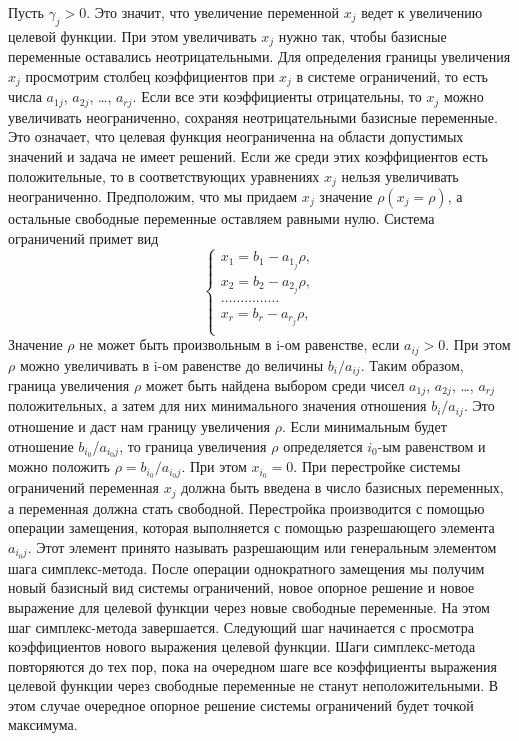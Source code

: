 Пусть $\gamma_j > 0$. Это значит, что увеличение переменной $x_j$ ведет к увеличению целевой функции. При этом увеличивать $x_j$ нужно так, чтобы базисные переменные оставались неотрицательными. Для определения границы увеличения $x_j$ просмотрим столбец коэффициентов при $x_j$ в системе ограничений, то есть числа
$a_{1j}$, $a_{2j}$, \dots, $a_{rj}$. Если все эти коэффициенты отрицательны, то $x_j$ можно увеличивать неограниченно, сохраняя неотрицательными базисные переменные. Это означает, что целевая функция неограниченна на области допустимых значений и задача не имеет решений. Если же среди этих коэффициентов есть положительные, то в соответствующих уравнениях $x_j$ нельзя увеличивать неограниченно. Предположим, что мы придаем $x_j$ значение $\rho  (x_j = \rho)$, а остальные свободные переменные оставляем равными нулю. Система ограничений примет вид
\begin{equation*}
\begin{cases}
x_1 = b_1 - a_{1_j}\rho,\\
x_2 = b_2 - a_{2_j}\rho,\\
\dots\dots\dots\dots\dots\\
x_r = b_r - a_{r_j}\rho,\\
\end{cases}
\end{equation*}
Значение $\rho$ не может быть произвольным в i-ом равенстве, если $a_{ij}>0$. При этом $\rho$ можно увеличивать в i-ом равенстве до величины $b_i/a_{ij}$. Таким образом, граница увеличения $\rho$ может быть найдена выбором среди чисел $a_{1j}$, $a_{2j}$, \dots, $a_{rj}$ положительных, а затем для них минимального значения отношения $b_i/a_{ij}$. Это отношение и даст нам границу увеличения $\rho$. Если минимальным будет отношение $b_{i_0}$/$a_{i_0j}$, то граница увеличения $\rho$ определяется $i_0$-ым равенством и можно положить $\rho = b_{i_0}/a_{i_0j}$. При этом $x_{i_0} = 0$.  При перестройке системы ограничений переменная $x_j$ должна быть введена в число базисных переменных, а переменная  должна стать свободной. Перестройка производится с помощью операции замещения, которая выполняется с помощью разрешающего элемента $a_{i_0j}$. Этот элемент принято называть разрешающим или генеральным элементом шага симплекс-метода. После операции однократного замещения мы получим новый базисный вид системы ограничений, новое опорное решение и новое выражение для целевой функции через новые свободные переменные. На этом шаг симплекс-метода завершается. Следующий шаг начинается с просмотра коэффициентов нового выражения целевой функции. Шаги симплекс-метода повторяются до тех пор, пока на очередном шаге все коэффициенты выражения целевой функции через свободные переменные не станут неположительными. В этом случае очередное опорное решение системы ограничений будет точкой максимума.

